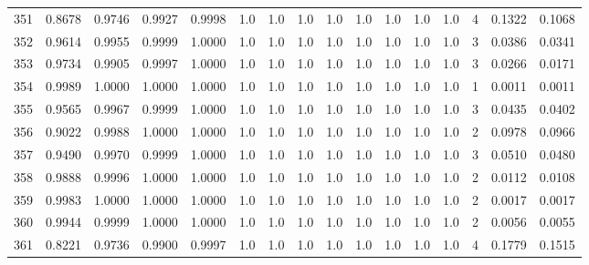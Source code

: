 \begin{tabular}{lrrrrrrrrrrrrrrr}
351 &      0.8678 &  0.9746 &  0.9927 &  0.9998 &     1.0 &     1.0 &     1.0 &     1.0 &     1.0 &     1.0 &      1.0 &        1.0 &      4 &                    0.1322 &                     0.1068 \\
352 &      0.9614 &  0.9955 &  0.9999 &  1.0000 &     1.0 &     1.0 &     1.0 &     1.0 &     1.0 &     1.0 &      1.0 &        1.0 &      3 &                    0.0386 &                     0.0341 \\
353 &      0.9734 &  0.9905 &  0.9997 &  1.0000 &     1.0 &     1.0 &     1.0 &     1.0 &     1.0 &     1.0 &      1.0 &        1.0 &      3 &                    0.0266 &                     0.0171 \\
354 &      0.9989 &  1.0000 &  1.0000 &  1.0000 &     1.0 &     1.0 &     1.0 &     1.0 &     1.0 &     1.0 &      1.0 &        1.0 &      1 &                    0.0011 &                     0.0011 \\
355 &      0.9565 &  0.9967 &  0.9999 &  1.0000 &     1.0 &     1.0 &     1.0 &     1.0 &     1.0 &     1.0 &      1.0 &        1.0 &      3 &                    0.0435 &                     0.0402 \\
356 &      0.9022 &  0.9988 &  1.0000 &  1.0000 &     1.0 &     1.0 &     1.0 &     1.0 &     1.0 &     1.0 &      1.0 &        1.0 &      2 &                    0.0978 &                     0.0966 \\
357 &      0.9490 &  0.9970 &  0.9999 &  1.0000 &     1.0 &     1.0 &     1.0 &     1.0 &     1.0 &     1.0 &      1.0 &        1.0 &      3 &                    0.0510 &                     0.0480 \\
358 &      0.9888 &  0.9996 &  1.0000 &  1.0000 &     1.0 &     1.0 &     1.0 &     1.0 &     1.0 &     1.0 &      1.0 &        1.0 &      2 &                    0.0112 &                     0.0108 \\
359 &      0.9983 &  1.0000 &  1.0000 &  1.0000 &     1.0 &     1.0 &     1.0 &     1.0 &     1.0 &     1.0 &      1.0 &        1.0 &      2 &                    0.0017 &                     0.0017 \\
360 &      0.9944 &  0.9999 &  1.0000 &  1.0000 &     1.0 &     1.0 &     1.0 &     1.0 &     1.0 &     1.0 &      1.0 &        1.0 &      2 &                    0.0056 &                     0.0055 \\
361 &      0.8221 &  0.9736 &  0.9900 &  0.9997 &     1.0 &     1.0 &     1.0 &     1.0 &     1.0 &     1.0 &      1.0 &        1.0 &      4 &                    0.1779 &                     0.1515 \\

\end{tabular}
